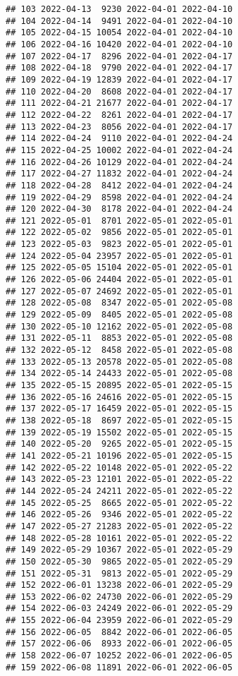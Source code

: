 \documentclass[
]{article}
\begin{document}
\begin{verbatim}
## 103 2022-04-13  9230 2022-04-01 2022-04-10
## 104 2022-04-14  9491 2022-04-01 2022-04-10
## 105 2022-04-15 10054 2022-04-01 2022-04-10
## 106 2022-04-16 10420 2022-04-01 2022-04-10
## 107 2022-04-17  8296 2022-04-01 2022-04-17
## 108 2022-04-18  9790 2022-04-01 2022-04-17
## 109 2022-04-19 12839 2022-04-01 2022-04-17
## 110 2022-04-20  8608 2022-04-01 2022-04-17
## 111 2022-04-21 21677 2022-04-01 2022-04-17
## 112 2022-04-22  8261 2022-04-01 2022-04-17
## 113 2022-04-23  8056 2022-04-01 2022-04-17
## 114 2022-04-24  9110 2022-04-01 2022-04-24
## 115 2022-04-25 10002 2022-04-01 2022-04-24
## 116 2022-04-26 10129 2022-04-01 2022-04-24
## 117 2022-04-27 11832 2022-04-01 2022-04-24
## 118 2022-04-28  8412 2022-04-01 2022-04-24
## 119 2022-04-29  8598 2022-04-01 2022-04-24
## 120 2022-04-30  8178 2022-04-01 2022-04-24
## 121 2022-05-01  8701 2022-05-01 2022-05-01
## 122 2022-05-02  9856 2022-05-01 2022-05-01
## 123 2022-05-03  9823 2022-05-01 2022-05-01
## 124 2022-05-04 23957 2022-05-01 2022-05-01
## 125 2022-05-05 15104 2022-05-01 2022-05-01
## 126 2022-05-06 24404 2022-05-01 2022-05-01
## 127 2022-05-07 24692 2022-05-01 2022-05-01
## 128 2022-05-08  8347 2022-05-01 2022-05-08
## 129 2022-05-09  8405 2022-05-01 2022-05-08
## 130 2022-05-10 12162 2022-05-01 2022-05-08
## 131 2022-05-11  8853 2022-05-01 2022-05-08
## 132 2022-05-12  8458 2022-05-01 2022-05-08
## 133 2022-05-13 20578 2022-05-01 2022-05-08
## 134 2022-05-14 24433 2022-05-01 2022-05-08
## 135 2022-05-15 20895 2022-05-01 2022-05-15
## 136 2022-05-16 24616 2022-05-01 2022-05-15
## 137 2022-05-17 16459 2022-05-01 2022-05-15
## 138 2022-05-18  8697 2022-05-01 2022-05-15
## 139 2022-05-19 15502 2022-05-01 2022-05-15
## 140 2022-05-20  9265 2022-05-01 2022-05-15
## 141 2022-05-21 10196 2022-05-01 2022-05-15
## 142 2022-05-22 10148 2022-05-01 2022-05-22
## 143 2022-05-23 12101 2022-05-01 2022-05-22
## 144 2022-05-24 24211 2022-05-01 2022-05-22
## 145 2022-05-25  8665 2022-05-01 2022-05-22
## 146 2022-05-26  9346 2022-05-01 2022-05-22
## 147 2022-05-27 21283 2022-05-01 2022-05-22
## 148 2022-05-28 10161 2022-05-01 2022-05-22
## 149 2022-05-29 10367 2022-05-01 2022-05-29
## 150 2022-05-30  9865 2022-05-01 2022-05-29
## 151 2022-05-31  9813 2022-05-01 2022-05-29
## 152 2022-06-01 13238 2022-06-01 2022-05-29
## 153 2022-06-02 24730 2022-06-01 2022-05-29
## 154 2022-06-03 24249 2022-06-01 2022-05-29
## 155 2022-06-04 23959 2022-06-01 2022-05-29
## 156 2022-06-05  8842 2022-06-01 2022-06-05
## 157 2022-06-06  8933 2022-06-01 2022-06-05
## 158 2022-06-07 10252 2022-06-01 2022-06-05
## 159 2022-06-08 11891 2022-06-01 2022-06-05

\end{verbatim}
\end{document}
